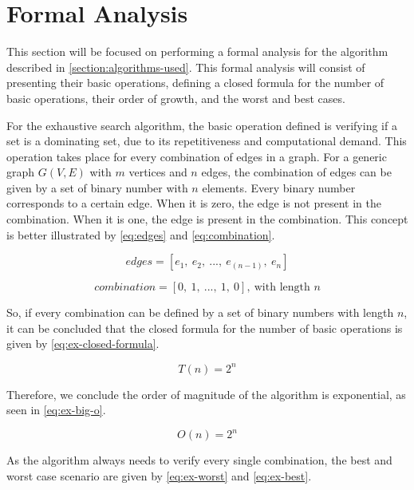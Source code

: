\section{Formal Analysis}\label{section:formal-analysis}
This section will be focused on performing a formal analysis for the algorithm described in \autoref{section:algorithms-used}.
This formal analysis will consist of presenting their basic operations, defining a closed formula for the number of basic operations, their order of growth, and the worst and best cases.

For the exhaustive search algorithm, the basic operation defined is verifying if a set is a dominating set, due to its repetitiveness and computational demand.
This operation takes place for every combination of edges in a graph.
For a generic graph $G(V,E)$ with $m$ vertices and $n$ edges, the combination of edges can be given by a set of binary number with $n$ elements.
Every binary number corresponds to a certain edge. 
When it is zero, the edge is not present in the combination.
When it is one, the edge is present in the combination.
This concept is better illustrated by \autoref{eq:edges} and \autoref{eq:combination}.

\begin{equation}
    edges = [e_1,\ e_2,\ ...,\ e_(n-1),\ e_n]
    \label{eq:edges}
\end{equation}

\begin{equation}
    combination = [0,\ 1,\ ...,\ 1,\ 0],\ \text{with length }n
    \label{eq:combination}
\end{equation}

So, if every combination can be defined by a set of binary numbers with length $n$, it can be concluded that the closed formula for the number of basic operations is given by \autoref{eq:ex-closed-formula}.

\begin{equation}
    T(n) = 2^n
    \label{eq:ex-closed-formula}
\end{equation}

Therefore, we conclude the order of magnitude of the algorithm is exponential, as seen in \autoref{eq:ex-big-o}.

\begin{equation}
    O(n) = 2^n
    \label{eq:ex-big-o}
\end{equation}

As the algorithm always needs to verify every single combination, the best and worst case scenario are given by \autoref{eq:ex-worst} and \autoref{eq:ex-best}.

